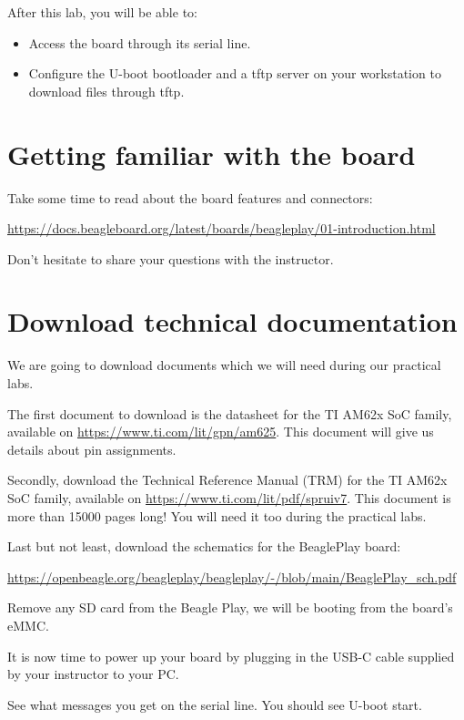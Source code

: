 
After this lab, you will be able to:
\begin{itemize}
\item Access the board through its serial line.
\item Configure the U-boot bootloader and a tftp server
      on your workstation to download files through tftp.
\end{itemize}

\section{Getting familiar with the board}

Take some time to read about the board features and connectors:

\url{https://docs.beagleboard.org/latest/boards/beagleplay/01-introduction.html}

Don't hesitate to share your questions with the instructor.

\section{Download technical documentation}

We are going to download documents which we will need during our
practical labs.

The first document to download is the datasheet for the
TI AM62x SoC family, available on
\url{https://www.ti.com/lit/gpn/am625}. This document will
give us details about pin assignments.

Secondly, download the Technical Reference Manual (TRM) for
the TI AM62x SoC family, available on
\url{https://www.ti.com/lit/pdf/spruiv7}.
This document is more than 15000 pages long! You will need it
too during the practical labs.

Last but not least, download the schematics for the BeaglePlay board:

\url{https://openbeagle.org/beagleplay/beagleplay/-/blob/main/BeaglePlay_sch.pdf}



Remove any SD card from the Beagle Play, we will be booting from the board's
eMMC.

It is now time to power up your board by plugging in the USB-C
cable supplied by your instructor to your PC.

See what messages you get on the serial line. You should see U-boot
start.

